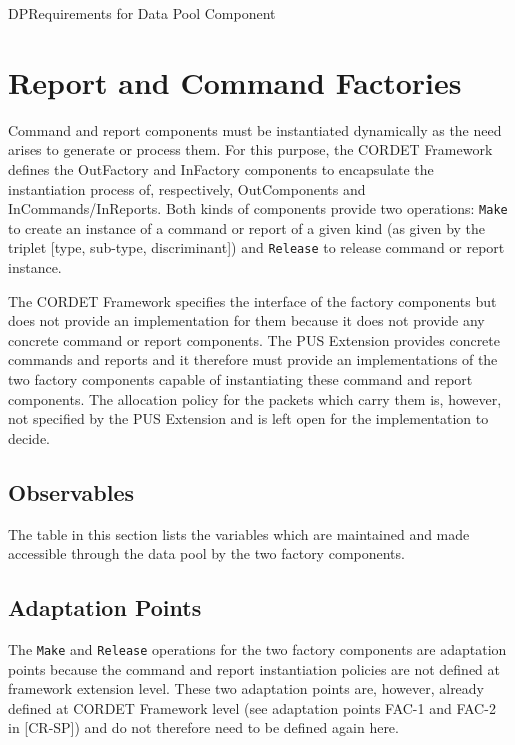 \documentclass{pnp_article}
\begin{document}
\begin{crReq}{DP}{Requirements for Data Pool Component}
\end{crReq}

\section{Report and Command Factories}\label{sec:repCmdFactories}
Command and report components must be instantiated dynamically as the need arises to generate or process them. For this purpose, the CORDET Framework defines the OutFactory and InFactory components to encapsulate the instantiation process of, respectively, OutComponents and InCommands/InReports. Both kinds of components provide two operations: \texttt{Make} to create an instance of a command or report of a given kind (as given by the triplet [type, sub-type, discriminant]) and \texttt{Release} to release command or report instance.

The CORDET Framework specifies the interface of the factory components but does not provide an implementation for them because it does not provide any concrete command or report components. The PUS Extension provides concrete commands and reports and it therefore must provide an implementations of the two factory components capable of instantiating these command and report components. The allocation policy for the packets which carry them is, however, not specified by the PUS Extension and is left open for the implementation to decide.

\subsection{Observables}
The table in this section lists the variables which are maintained and made accessible through the data pool by the two factory components.


\subsection{Adaptation Points}
The \texttt{Make} and \texttt{Release} operations for the two factory components are adaptation points because the command and report instantiation policies are not defined at framework extension level. These two adaptation points are, however, already defined at CORDET Framework level (see adaptation points FAC-1 and FAC-2 in [CR-SP]) and do not therefore need to be defined again here.
\end{document}
